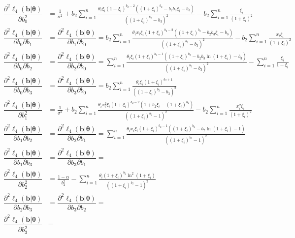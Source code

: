 \documentclass[11pt, letterpaper]{article}
\numberwithin{equation}{section}
\begin{document}
\begin{align*}
\dfrac{\partial^2 \ell_4(\bm b | \bm \theta)}{\partial b_0 ^2} &=  \frac{1}{\sigma^2} + b_2 \sum_{i=1}^n \frac{\theta_i \xi_i (1+\xi_i)^{b_2-2}((1+\xi_i)^{b_2} - b_2 b_3 \xi_i - b_3)}{\left((1+\xi_i)^{b_2} - b_3 \right)^2} -b_2 \sum_{i=1}^n \frac{ \xi_i}{(1+\xi_i )^2}\\
\dfrac{\partial^2 \ell_4(\bm b | \bm \theta)}{\partial b_0 \partial b_1} &= \dfrac{\partial^2 \ell_4(\bm b | \bm \theta)}{\partial b_1 \partial b_0} =  b_2 \sum_{i=1}^n \frac{\theta_i x_i \xi_i (1+\xi_i)^{b_2-2}( (1+\xi_i)^{b_2}- b_2 b_3 \xi_i - b_3)}{\left((1+\xi_i)^{b_2}- b_3 \right)^2} -b_2 \sum_{i=1}^n \frac{x_i \xi_i}{(1+\xi_i )^2}\\
\dfrac{\partial^2 \ell_4(\bm b | \bm \theta)}{\partial b_0 \partial b_2} &= \dfrac{\partial^2 \ell_4(\bm b | \bm \theta)}{\partial b_2 \partial b_0} = \sum_{i=1}^n \frac{\theta_i\xi_i(1+\xi_i)^{b_2-1}\left((1+\xi_i)^{b_2}- b_2 b_3 \ln (1+\xi_i) -b_3 \right)}{\left((1+\xi_i)^{b_2} - b_3 \right)^2} -\sum_{i=1}^n \frac{\xi_i}{1-\xi_i} \\
\dfrac{\partial^2 \ell_4(\bm b | \bm \theta)}{\partial b_0 \partial b_3} &= \dfrac{\partial^2 \ell_4(\bm b | \bm \theta)}{\partial b_3 \partial b_0} = b_2 \sum_{i=1}^n \frac{\theta_i \xi_i(1+\xi_i)^{b_2+1}}{\left((1+\xi_i)^{b_2}- b_3 \right)^2}  \\
\dfrac{\partial^2 \ell_4(\bm b | \bm \theta)}{\partial b_1 ^2} &= \frac{1}{\sigma^2} + b_2 \sum_{i=1}^n \frac{\theta_i x_i^2\xi_i (1+\xi_i)^{b_2-2}(1+b_2 \xi_i - (1+\xi_i)^{b_2})}{\left((1+\xi_i)^{b_2} - 1 \right)^2} -b_2 \sum_{i=1}^n \frac{x_i^2 \xi_i}{(1+\xi_i )^2}\\
\dfrac{\partial^2 \ell_4(\bm b | \bm \theta)}{\partial b_1 \partial b_2} &= \dfrac{\partial^2 \ell_4(\bm b | \bm \theta)}{\partial b_2 \partial b_1} =  \sum_{i=1}^n \frac{\theta_i x_i\xi_i(1+\xi_i)^{b_2-1}\left((1+\xi_i)^{b_2}- b_2 \ln (1+\xi_i) -1 \right)}{\left((1+\xi_i)^{b_2} - 1 \right)^2} \\
\dfrac{\partial^2 \ell_4(\bm b | \bm \theta)}{\partial b_1 \partial b_3} &= \dfrac{\partial^2 \ell_4(\bm b | \bm \theta)}{\partial b_3 \partial b_1} = \\
\dfrac{\partial^2 \ell_4(\bm b | \bm \theta)}{\partial b_2 ^2} &= \frac{1-\alpha}{b_2^2} - \sum_{i=1}^n \frac{\theta_i(1+\xi_i)^{b_2}\ln ^2(1+\xi_i)}{\left((1+\xi_i)^{b_2} - 1 \right)^2} \\
\dfrac{\partial^2 \ell_4(\bm b | \bm \theta)}{\partial b_2 \partial b_3} &= \dfrac{\partial^2 \ell_4(\bm b | \bm \theta)}{\partial b_3 \partial b_2} = \\
\dfrac{\partial^2 \ell_4(\bm b | \bm \theta)}{ \partial b_3^2} &= \\
\end{align*}
\end{document}
